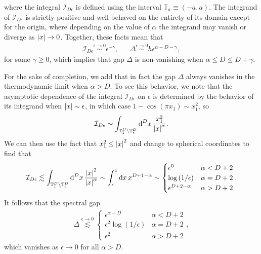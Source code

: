 \documentclass[nofootinbib,notitlepage,11pt]{revtex4-2}
\newcommand{\f}[2]{\dfrac{#1}{#2}} %
\newcommand{\p}[1]{\left(#1\right)} %
\newcommand{\1}{\mathds{1}}
\renewcommand{\d}{\text{d}}
\newcommand{\I}{\mathcal{I}}
\newcommand{\TT}{\mathbb{T}}
\begin{document}
where the integral $\I_{D\epsilon}$ is defined using the interval
$\TT_a\equiv\p{-a,a}$.  The integrand of $\I_{D\epsilon}$ is strictly
positive and well-behaved on the entirety of its domain except for the
origin, where depending on the value of $\alpha$ the integrand may
vanish or diverge as $\abs{x}\to0$.  Together, these facts mean that
\begin{align}
  \I_{D\epsilon} \stackrel{\epsilon\to0}{\sim} \epsilon^{-\gamma},
  &&
  \Delta \stackrel{\epsilon\to0}{\sim} h \epsilon^{\alpha-D-\gamma},
\end{align}
for some $\gamma\ge0$, which implies that gap $\Delta$ is
non-vanishing when $\alpha\le D\le D+\gamma$.

For the sake of completion, we add that in fact the gap $\Delta$
always vanishes in the thermodynamic limit when $\alpha>D$.  To see
this behavior, we note that the asymptotic dependence of the integral
$\I_{D\epsilon}$ on $\epsilon$ is determined by the behavior of its
integrand when $\abs{x}\sim\epsilon$, in which case
$1-\cos\p{\pi x_1}\sim x_1^2$, so
\begin{align}
  \I_{D\epsilon}
  \sim \int_{\TT_1^D\setminus\TT_\epsilon^D} \d^Dx\,
  \f{x_1^2}{\abs{x}^\alpha}.
\end{align}
We can then use the fact that $x_1^2\le\abs{x}^2$ and change to
spherical coordinates to find that
\begin{align}
  \I_{D\epsilon} \lesssim
  \int_{\TT_1^D\setminus\TT_\epsilon^D} \d^Dx\,
  \f{\abs{x}^2}{\abs{x}^\alpha}
  \sim \int_\epsilon^1 \d x\, x^{D+1-\alpha}
  \sim
  \begin{cases}
    \epsilon^0 & \alpha < D+2 \\
    \log\p{1/\epsilon} & \alpha = D+2 \\
    \epsilon^{D+2-\alpha} & \alpha > D+2
  \end{cases}.
\end{align}
It follows that the spectral gap
\begin{align}
  \Delta \stackrel{\epsilon\to0}{\lesssim}
  \begin{cases}
    \epsilon^{\alpha-D} & \alpha < D+2 \\
    \epsilon^2 \log\p{1/\epsilon} & \alpha = D + 2 \\
    \epsilon^2 & \alpha > D+2
  \end{cases},
\end{align}
which vanishes as $\epsilon\to0$ for all $\alpha>D$.

\end{document}
